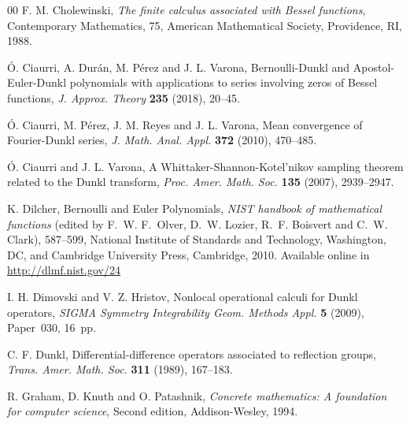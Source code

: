 \documentclass[10pt]{article}
\theoremstyle{plain}
\theoremstyle{definition}
\numberwithin{equation}{section} %
\newcommand{\RR}{\mathbb{R}}
\begin{document}
\begin{thebibliography}{00}
F. M. Cholewinski, 
\textit{The finite calculus associated with Bessel functions}, 
Contemporary Mathematics, 75, American Mathematical Society, Providence, RI, 1988.

\'O. Ciaurri, A. Dur\'an, M. P\'erez and J. L. Varona,
Bernoulli-Dunkl and Apostol-Euler-Dunkl polynomials with applications to series involving
zeros of Bessel functions, 
\textit{J. Approx. Theory} \textbf{235} (2018), 20--45.

\'O. Ciaurri, M. P\'erez, J. M. Reyes and J. L. Varona,
Mean convergence of Fourier-Dunkl series,
\textit{J. Math. Anal. Appl.}
\textbf{372} (2010), 470--485.

\'O. Ciaurri and J. L. Varona,
A Whittaker-Shannon-Kotel'nikov sampling theorem related to the Dunkl transform,
\textit{Proc. Amer. Math. Soc.}
\textbf{135} (2007), 2939--2947.

K. Dilcher,
Bernoulli and Euler Polynomials,
\textit{NIST handbook of mathematical functions}
(edited by F.~W. F.~Olver, D.~W. Lozier, R.~F. Boisvert and C.~W. Clark),
587--599, %
National Institute of Standards and Technology, Washington, DC, and
Cambridge University Press, Cambridge, 2010.
Available online in \url{http://dlmf.nist.gov/24}

I. H. Dimovski and V. Z. Hristov,
Nonlocal operational calculi for Dunkl operators,
\textit{SIGMA Symmetry Integrability Geom. Methods Appl.}
\textbf{5} (2009), Paper~030, 16~pp.


C. F. Dunkl,
{Differential-difference operators associated to reflection groups},
\textit{Trans. Amer. Math. Soc.}
\textbf{311} (1989), 167--183.

R. Graham, D. Knuth and O. Patashnik, 
\textit{Concrete mathematics: A foundation for computer science}, 
Second edition, Addison-Wesley, 1994.


\end{thebibliography}
\end{document}
